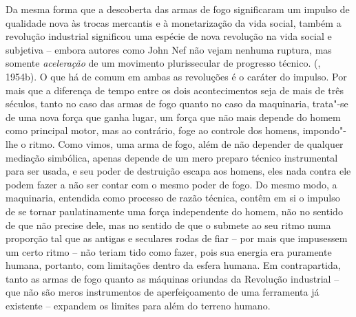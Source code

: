 Da mesma forma que a descoberta das armas de fogo significaram um
impulso de qualidade nova às trocas mercantis e à monetarização da vida
social, também a revolução industrial significou uma espécie de nova
revolução na vida social e subjetiva -- embora autores como John Nef não
vejam nenhuma ruptura, mas somente \emph{aceleração} de um movimento
plurissecular de progresso técnico. (, 1954b). O que há de comum em
ambas as revoluções é o caráter do impulso. Por mais que a diferença de
tempo entre os dois acontecimentos seja de mais de três séculos, tanto
no caso das armas de fogo quanto no caso da maquinaria, trata"-se de uma
nova força que ganha lugar, um força que não mais depende do homem como
principal motor, mas ao contrário, foge ao controle dos homens,
impondo"-lhe o ritmo. Como vimos, uma arma de fogo, além de não depender
de qualquer mediação simbólica, apenas depende de um mero preparo
técnico instrumental para ser usada, e seu poder de destruição escapa
aos homens, eles nada contra ele podem fazer a não ser contar com o
mesmo poder de fogo. Do mesmo modo, a maquinaria, entendida como
processo de razão técnica, contêm em si o impulso de se tornar
paulatinamente uma força independente do homem, não no sentido de que
não precise dele, mas no sentido de que o submete ao seu ritmo numa
proporção tal que as antigas e seculares rodas de fiar -- por mais que
impusessem um certo ritmo -- não teriam tido como fazer, pois sua
energia era puramente humana, portanto, com limitações dentro da esfera
humana. Em contrapartida, tanto as armas de fogo quanto as máquinas
oriundas da Revolução industrial -- que não são meros instrumentos de
aperfeiçoamento de uma ferramenta já existente -- expandem os limites
para além do terreno humano.

